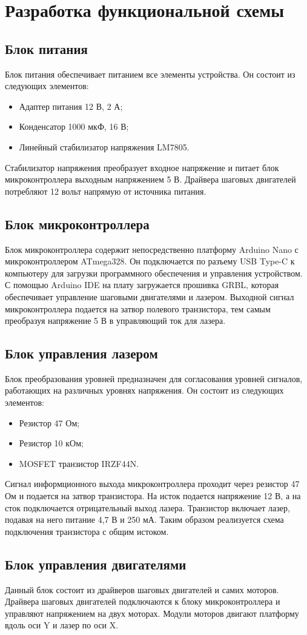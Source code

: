 \section{Разработка функциональной схемы}
\label{sec:func}

\subsection{Блок питания}
Блок питания обеспечивает питанием все элементы устройства. Он состоит из следующих элементов:
\begin{itemize}
    \item Адаптер питания 12 В, 2 А;
    \item Конденсатор 1000 мкФ, 16 В;
    \item Линейный стабилизатор напряжения LM7805.
\end{itemize}
Стабилизатор напряжения преобразует входное напряжение и питает блок микроконтроллера выходным напряжением 5 В\cite{schemt_3}.
Драйвера шаговых двигателей потребляют 12 вольт напрямую от источника питания.

\subsection{Блок микроконтроллера}
Блок микроконтроллера содержит непосредственно платформу Arduino Nano с микроконтроллером ATmega328.
Он подключается по разъему USB Type-C к компьютеру для загрузки программного обеспечения и управления устройством.
С помощью Arduino IDE на плату загружается прошивка GRBL, которая обеспечивает управление шаговыми двигателями и лазером.
Выходной сигнал микроконтроллера подается на затвор полевого транзистора, тем самым преобразуя напряжение 5 В 
в управляющий ток для лазера.

\subsection{Блок управления лазером} 
Блок преобразования уровней предназначен для согласования уровней сигналов, работающих на различных уровнях напряжения. 
Он состоит из следующих элементов:
\begin{itemize}
    \item Резистор 47 Ом;
    \item Резистор 10 кОм;
    \item MOSFET транзистор IRZF44N.
\end{itemize}
Сигнал информционного выхода микроконтроллера проходит через резистор 47 Ом и подается на затвор транзистора.
На исток подается напряжение 12 В, а на сток подключается отрицательный выход лазера.
Транзистор включает лазер, подавая на него питание 4,7 В и 250 мА.
Таким образом реализуется схема подключения транзистора с общим истоком\cite{schemt_1}.

\subsection{Блок управления двигателями}
Данный блок состоит из драйверов шаговых двигателей и самих моторов.
Драйвера шаговых двигателей подключаются к блоку микроконтроллера и управляют напряжением на двух моторах.
Модули моторов двигают платформу вдоль оси Y и лазер по оси X.
